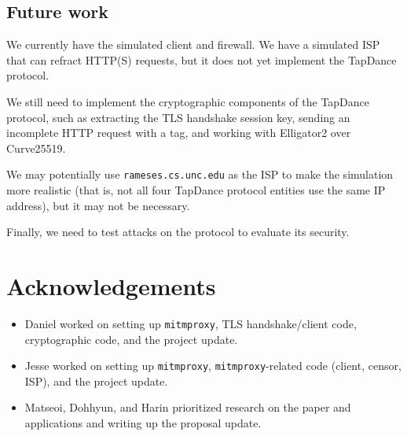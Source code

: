 \documentclass[conference]{IEEEtran}
\begin{document}
\subsection{Future work}

We currently have the simulated client and firewall. We have a simulated ISP that can refract HTTP(S) requests, but it does not yet implement the TapDance protocol. 

We still need to implement the cryptographic components of the TapDance protocol, such as extracting the TLS handshake session key, sending an incomplete HTTP request with a tag, and working with Elligator2 over Curve25519. 


We may potentially use \texttt{rameses.cs.unc.edu} as the ISP to make the simulation more realistic (that is, not all four TapDance protocol entities use the same IP address), but it may not be necessary.

Finally, we need to test attacks on the protocol to evaluate its security.

\section{Acknowledgements}
\begin{itemize}
    \item Daniel worked on setting up \texttt{mitmproxy}, TLS handshake/client code, cryptographic code, and the project update.
    \item Jesse worked on setting up \texttt{mitmproxy}, \texttt{mitmproxy}-related code (client, censor, ISP), and the project update.
    \item Matseoi, Dohhyun, and Harin prioritized research on the paper and applications and writing up the proposal update. 
\end{itemize}

\printbibliography






\end{document}
